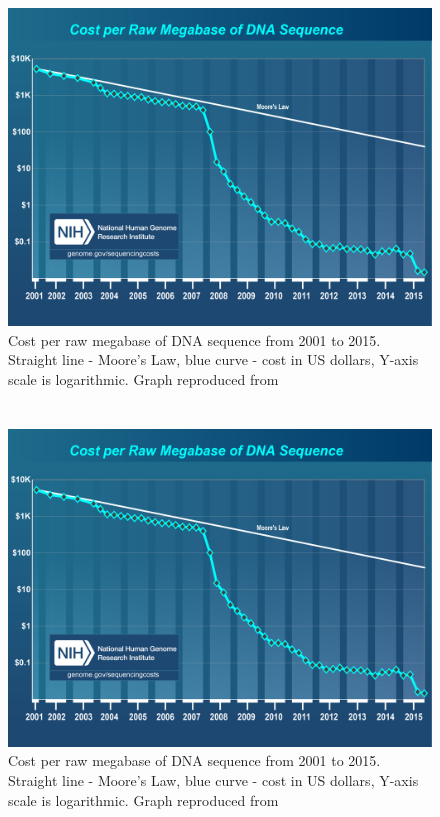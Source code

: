 \chapter{}
\begin{figure}[hb!]
\begin{center}
\includegraphics[scale=0.5]{costperMb2015_4.jpg}
\end{center}
\caption[Cost per raw megabase of DNA sequence from 2001 to 2015]{Cost per raw megabase of DNA sequence from 2001 to 2015. Straight line - Moore's Law, blue curve - cost in US dollars, Y-axis scale is logarithmic. Graph reproduced from \citep{wetterstrand2016}}
\end{figure}

\chapter{}
\begin{figure}[hb!]
\begin{center}
\includegraphics[scale=0.5]{costperMb2015_4.jpg}
\end{center}
\caption[Cost per raw megabase of DNA sequence from 2001 to 2015]{Cost per raw megabase of DNA sequence from 2001 to 2015. Straight line - Moore's Law, blue curve - cost in US dollars, Y-axis scale is logarithmic. Graph reproduced from \citep{wetterstrand2016}}
\end{figure}


